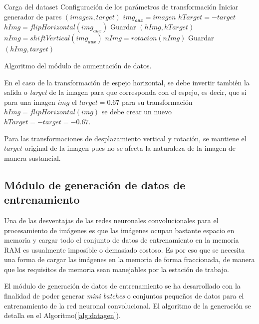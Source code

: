     \begin{algorithm}
        \begin{algorithmic}[1]
        \STATE Carga del dataset
        \STATE Configuración de los parámetros de transformación
        \STATE Iniciar generador de pares $(imagen,target)$
            \STATE $img_{aux} = imagen$
                \STATE $hTarget = -target$  
                \STATE $hImg = flipHorizontal(img_{aux})$
                \STATE Guardar $(hImg,hTarget)$
                \STATE $nImg = shiftVertical(img_{aux})$
                \STATE $nImg = rotacion(nImg)$
                \STATE Guardar $(hImg,target)$
            \ENDIF
        \ENDFOR
        
        \end{algorithmic}
        \caption{Algoritmo del módulo de aumentación de datos.}\label{alg:msgsync}
    \end{algorithm}

    En el caso de la transformación de espejo horizontal, se debe invertir también la salida o \textit{target} de la imagen 
    para que corresponda con el espejo, es decir, que si para una imagen $img$ el $target = 0.67$ para su transformación $hImg = flipHorizontal(img)$ 
    se debe crear un nuevo $hTarget = -target = -0.67$. 

    Para las transformaciones de desplazamiento vertical y rotación, se mantiene el $target$ original de la imagen pues no se 
    afecta la naturaleza de la imagen de manera sustancial.


    \subsection{Módulo de generación de datos de entrenamiento}

    Una de las desventajas de las redes neuronales convolucionales para el procesamiento de imágenes es que las imágenes 
    ocupan bastante espacio en memoria y cargar todo el conjunto de datos de entrenamiento en la memoria RAM es usualmente 
    imposible o demasiado costoso. Es por eso que se necesita una forma de cargar las imágenes en la memoria de forma 
    fraccionada, de manera que los requisitos de memoria sean manejables por la estación de trabajo. 

    El módulo de generación de datos de entrenamiento se ha desarrollado con la finalidad de poder generar \textit{mini batches} 
    o conjuntos pequeños de datos para el entrenamiento de la red neuronal convolucional. El algoritmo de la generación se 
    detalla en el Algoritmo(\ref{alg:datagen}).

